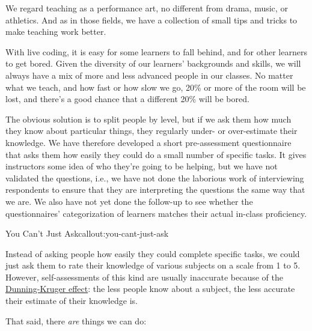 
We regard teaching as a performance art, no different from drama, music,
or athletics. And as in those fields, we have a collection of small tips
and tricks to make teaching work better.


With live coding, it is easy for some learners to fall behind, and for
other learners to get bored. Given the diversity of our learners'
backgrounds and skills, we will always have a mix of more and less
advanced people in our classes. No matter what we teach, and how fast or
how slow we go, 20\% or more of the room will be lost, and there's a
good chance that a different 20\% will be bored.

The obvious solution is to split people by level, but if we ask them how
much they know about particular things, they regularly under- or
over-estimate their knowledge. We have therefore developed a short
pre-assessment questionnaire that asks them how easily they could do a
small number of specific tasks. It gives instructors some idea of who
they're going to be helping, but we have not validated the questions,
i.e., we have not done the laborious work of interviewing respondents to
ensure that they are interpreting the questions the same way that we
are. We also have not yet done the follow-up to see whether the
questionnaires' categorization of learners matches their actual in-class
proficiency.

\begin{callout}{You Can't Just Ask}{callout:you-cant-just-ask}

Instead of asking people how easily they could complete specific tasks,
we could just ask them to rate their knowledge of various subjects on a
scale from 1 to 5. However, self-assessments of this kind are usually
inaccurate because of the
\href{https://en.wikipedia.org/wiki/Dunning\%E2\%80\%93Kruger\_effect}{Dunning-Kruger
effect}: the less people know about a subject, the less accurate their
estimate of their knowledge is.
\end{callout}

That said, there \emph{are} things we can do:


